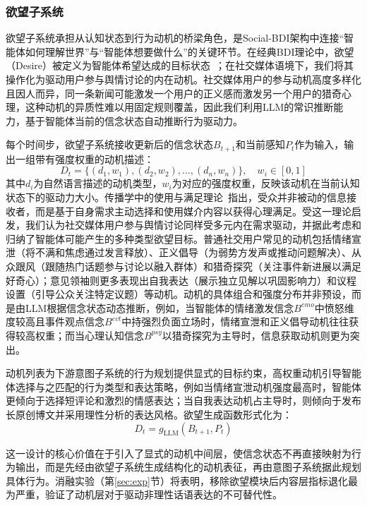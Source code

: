 \documentclass[a4paper,fleqn]{cas-dc}
\begin{document}
\subsubsection{欲望子系统}

欲望子系统承担从认知状态到行为动机的桥梁角色，是Social-BDI架构中连接“智能体如何理解世界”与“智能体想要做什么”的关键环节。在经典BDI理论中，欲望（Desire）被定义为智能体希望达成的目标状态~\citep{bratman_intention_1987}；在社交媒体语境下，我们将其操作化为驱动用户参与舆情讨论的内在动机。社交媒体用户的参与动机高度多样化且因人而异，同一条新闻可能激发一个用户的正义感而激发另一个用户的猎奇心理，这种动机的异质性难以用固定规则覆盖，因此我们利用LLM的常识推断能力，基于智能体当前的信念状态自动推断行为驱动力。

每个时间步，欲望子系统接收更新后的信念状态$B_{t+1}$和当前感知$P_t$作为输入，输出一组带有强度权重的动机描述：
\begin{equation}
D_t = \{(d_1, w_1), (d_2, w_2), \ldots, (d_n, w_n)\}, \quad w_i \in [0, 1]
\end{equation}
其中$d_i$为自然语言描述的动机类型，$w_i$为对应的强度权重，反映该动机在当前认知状态下的驱动力大小。传播学中的使用与满足理论~\citep{katz_uses_1973}指出，受众并非被动的信息接收者，而是基于自身需求主动选择和使用媒介内容以获得心理满足。受这一理论启发，我们认为社交媒体用户参与舆情讨论同样受多元内在需求驱动，并据此考虑和归纳了智能体可能产生的多种类型欲望目标。普通社交用户常见的动机包括情绪宣泄（将不满和焦虑通过发言释放）、正义倡导（为弱势方发声或推动问题解决）、从众跟风（跟随热门话题参与讨论以融入群体）和猎奇探究（关注事件新进展以满足好奇心）；意见领袖则更多表现出自我表达（展示独立见解以巩固影响力）和议程设置（引导公众关注特定议题）等动机。动机的具体组合和强度分布并非预设，而是由LLM根据信念状态动态推断，例如，当智能体的情绪激发信念$B^{emo}$中愤怒维度较高且事件观点信念$B^{evt}$中持强烈负面立场时，情绪宣泄和正义倡导动机往往获得较高权重；而当心理认知信念$B^{psy}$以猎奇探究为主导时，信息获取动机则更为突出。

动机列表为下游意图子系统的行为规划提供显式的目标约束，高权重动机引导智能体选择与之匹配的行为类型和表达策略，例如当情绪宣泄动机强度最高时，智能体更倾向于选择短评论和激烈的情感表达；当自我表达动机占主导时，则倾向于发布长原创博文并采用理性分析的表达风格。欲望生成函数形式化为：
\begin{equation}
D_t = g_{\text{LLM}}(B_{t+1}, P_t)
\end{equation}

这一设计的核心价值在于引入了显式的动机中间层，使信念状态不再直接映射为行为输出，而是先经由欲望子系统生成结构化的动机表征，再由意图子系统据此规划具体行为。消融实验（第\ref{sec:exp}节）将表明，移除欲望模块后内容层指标退化最为严重，验证了动机层对于驱动非理性话语表达的不可替代性。
\end{document}
